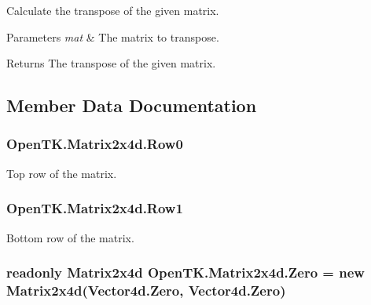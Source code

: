 Calculate the transpose of the given matrix. 


\begin{DoxyParams}{Parameters}
{\em mat} & The matrix to transpose.\\
\hline
\end{DoxyParams}
\begin{DoxyReturn}{Returns}
The transpose of the given matrix.
\end{DoxyReturn}


\subsection{Member Data Documentation}
\hypertarget{struct_open_t_k_1_1_matrix2x4d_a2003dc9b0f0478fc9ef05008fc493e23}{
\subsubsection[{Row0}]{ Open\-T\-K.\-Matrix2x4d.\-Row0}}\label{struct_open_t_k_1_1_matrix2x4d_a2003dc9b0f0478fc9ef05008fc493e23}


Top row of the matrix. 

\hypertarget{struct_open_t_k_1_1_matrix2x4d_ac9a7b75a51ad79898e2464d21785e0d3}{
\subsubsection[{Row1}]{ Open\-T\-K.\-Matrix2x4d.\-Row1}}\label{struct_open_t_k_1_1_matrix2x4d_ac9a7b75a51ad79898e2464d21785e0d3}


Bottom row of the matrix. 

\hypertarget{struct_open_t_k_1_1_matrix2x4d_a5abb66a4114192a92a00cffceec3ebe5}{
\subsubsection[{Zero}]{\setlength{\rightskip}{0pt plus 5cm}readonly {\bf Matrix2x4d} Open\-T\-K.\-Matrix2x4d.\-Zero = new {\bf Matrix2x4d}(Vector4d.\-Zero, Vector4d.\-Zero)\hspace{0.3cm}{\ttfamily [static]}}}\label{struct_open_t_k_1_1_matrix2x4d_a5abb66a4114192a92a00cffceec3ebe5}


